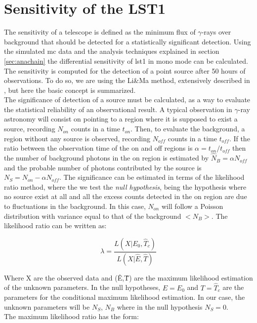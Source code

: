 \documentclass[main.tex]{subfiles}
\begin{document}
\section{Sensitivity of the LST1}

The sensitivity of a telescope is defined as the minimum flux of $\gamma$-rays over background that should be detected for a statistically significant detection. Using the simulated \gls{mc} data and the analysis techniques explained in section \ref{sec:anachain} the differential sensitivity of \gls{lst}1 in mono mode can be calculated.\\
The sensitivity is computed for the detection of a point source after 50 hours of observations. To do so, we are using the Li\&Ma method, extensively described in \cite{1983LiMa}, but here the basic concept is summarized.\\
The significance of detection of a source must be calculated, as a way to evaluate the statistical reliability of an observational result. A typical observation in $\gamma$-ray astronomy will consist on pointing to a region where it is supposed to exist a source, recording $N_{on}$ counts in a time $t_{on}$. Then, to evaluate the background, a region without any source is observed, recording $N_{off}$ counts in a time $t_{off}$. If the ratio between the observation time of the on and off regions is $\alpha = t_{on}/t_{off}$ then the number of background photons in the on region is estimated by $\hat{N}_{B} = \alpha N_{off}$  and the probable number of photons contributed by the source is $N_{S} = N_{on}-\alpha N_{off}$. The significance can be estimated in terms of the likelihood ratio method, where the we test the \textit{null hypothesis}, being the hypothesis where no source exist at all and all the excess counts detected in the on region are due to fluctuations in the background. In this case, $N_{on}$ will follow a Poisson distribution with variance equal to that of the background $<N_{B}>$. The likelihood ratio can be written as:

\begin{equation}
  \lambda = \frac{L(X | E_{0}, \hat{T}_{c})}{L(X|\hat{E},\hat{T})}
\end{equation}

Where X are the observed data and (\^{E},\^{T}) are the maximum likelihood estimation of the unknown parameters. In the null hypotheses, $E=E_{0}$ and $T=\hat{T}_{c}$ are the parameters for the conditional maximum likelihood estimation. In our case, the unknown parameters will be $N_{S}$, $N_{B}$ where in the null hypothesis $N_{S}=0$.\\
The maximum likelihood ratio has the form:
\end{document}
